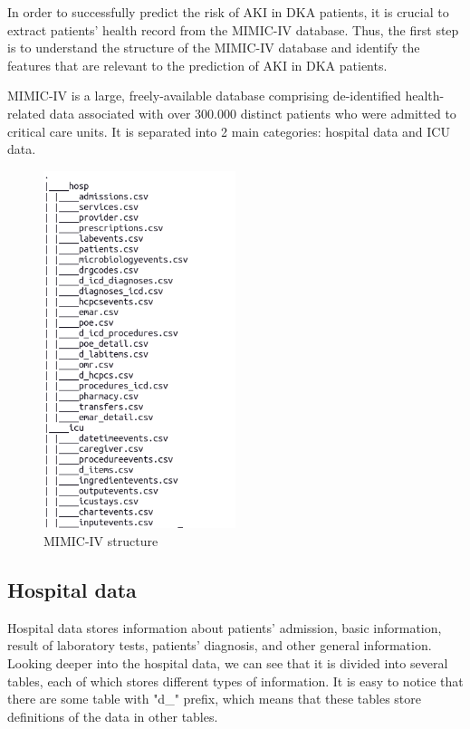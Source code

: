 \documentclass[../main.tex]{subfiles}
\begin{document}
In order to successfully predict the risk of AKI in DKA patients, it is crucial to extract patients' health record from the MIMIC-IV database.
Thus, the first step is to understand the structure of the MIMIC-IV database and identify the features that are relevant to the prediction of AKI in DKA patients.

MIMIC-IV is a large, freely-available database comprising de-identified health-related data associated with over 300.000 distinct patients who were admitted to critical care units.
It is separated into 2 main categories: hospital data and ICU data.

\begin{figure}[ht]
    \centering
    \includegraphics[width=0.5\textwidth]{Figure/MIMIC-IV_tree.png}
    \caption{MIMIC-IV structure}
    \label{fig:mimic-iv-structure}
\end{figure}


\subsection{Hospital data}

Hospital data stores information about patients' admission, basic information, result of laboratory tests, patients' diagnosis, and other general information.
Looking deeper into the hospital data, we can see that it is divided into several tables, each of which stores different types of information.
It is easy to notice that there are some table with "d\_" prefix, which means that these tables store definitions of the data in other tables.
\end{document}
